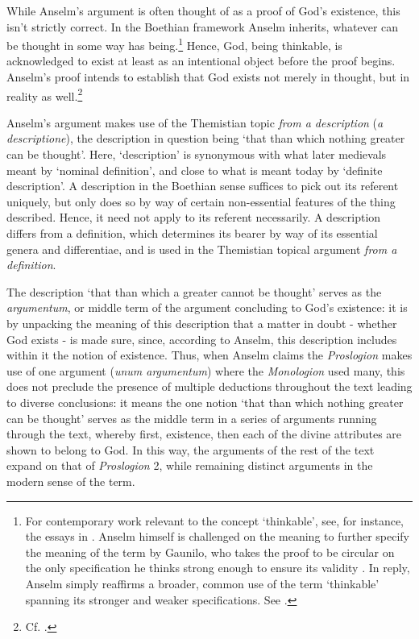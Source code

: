 \documentclass[]{amsart}
\begin{document}
While Anselm's argument is often thought of as a proof of God's existence, this isn't strictly correct. In the Boethian framework Anselm inherits, whatever can be thought in some way has being.\footnote{For contemporary work relevant to the concept `thinkable', see, for instance, the essays in \cite{Gendler2002}. Anselm himself is challenged on the meaning to further specify the meaning of the term by Gaunilo, who takes the proof to be circular on the only specification he thinks strong enough to ensure its validity \cite[Pro. ins. 2]{ProIns}. In reply, Anselm simply reaffirms a broader, common use of the term `thinkable' spanning its stronger and weaker specifications. See \cite[Resp. 1]{AnselmResp}.} Hence, God, being thinkable, is acknowledged to exist at least as an intentional object before the proof begins. Anselm's proof intends to establish that God exists not merely in thought, but in reality as well.\footnote{Cf. \cite{Klima2000}.}

Anselm's argument makes use of the Themistian topic \textit{from a description} (\textit{a descriptione}), the description in question being `that than which nothing greater can be thought'. Here, `description' is synonymous with what later medievals meant by `nominal definition', and close to what is meant today by `definite description'. A description in the Boethian sense suffices to pick out its referent uniquely, but only does so by way of certain non-essential features of the thing described. Hence, it need not apply to its referent necessarily. A description differs from a definition, which determines its bearer by way of its essential genera and differentiae, and is used in the Themistian topical argument \textit{from a definition}. 

The description `that than which a greater cannot be thought' serves as the \textit{argumentum}, or middle term of the argument concluding to God's existence: it is by unpacking the meaning of this description that a matter in doubt - whether God exists - is made sure, since, according to Anselm, this description includes within it the notion of existence. Thus, when Anselm claims the \textit{Proslogion} makes use of one argument (\textit{unum argumentum}) where the \textit{Monologion} used many, this does not preclude the presence of multiple deductions throughout the text leading to diverse conclusions: it means the one notion `that than which nothing greater can be thought' serves as the middle term in a series of arguments running through the text, whereby first, existence, then each of the divine attributes are shown to belong to God. In this way, the arguments of the rest of the text expand on that of \textit{Proslogion} 2, while remaining distinct arguments in the modern sense of the term.
\end{document}
